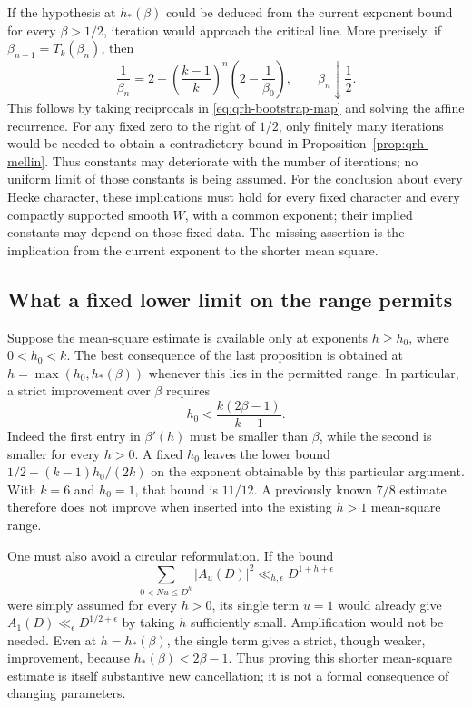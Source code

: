 If the hypothesis at $h_*(\beta)$ could be deduced from the
current exponent bound for every $\beta>1/2$, iteration
would approach the critical line. More precisely, if
$\beta_{n+1}=T_k(\beta_n)$, then
\[
 \frac1{\beta_n}
 =2-\left(\frac{k-1}{k}\right)^n
               \left(2-\frac1{\beta_0}\right),
 \qquad \beta_n\downarrow\frac12.
\]
This follows by taking reciprocals in
\eqref{eq:qrh-bootstrap-map} and solving the affine
recurrence. For any fixed zero to the right of $1/2$,
only finitely many iterations would be needed to obtain
a contradictory bound in Proposition~\ref{prop:qrh-mellin}.
Thus constants may deteriorate with the number of
iterations; no uniform limit of those constants is being
assumed. For the conclusion about every Hecke character, these
implications must hold for every fixed character and every
compactly supported smooth $W$, with a common exponent;
their implied constants may depend on those fixed data.
The missing assertion is the implication from the
current exponent to the shorter mean square.

\subsection{What a fixed lower limit on the range permits}

Suppose the mean-square estimate is available only at
exponents $h\ge h_0$, where $0<h_0<k$. The best consequence of the last
proposition is obtained at $h=\max(h_0,h_*(\beta))$
whenever this lies in the permitted range. In particular,
a strict improvement over $\beta$ requires
\[
 h_0<\frac{k(2\beta-1)}{k-1}.
\]
Indeed the first entry in $\beta'(h)$ must be smaller than
$\beta$, while the second is smaller for every $h>0$.
A fixed $h_0$ leaves the lower bound
$1/2+(k-1)h_0/(2k)$ on the exponent obtainable by this
particular argument. With $k=6$ and $h_0=1$, that bound
is $11/12$. A previously known $7/8$ estimate therefore
does not improve when inserted into the existing
$h>1$ mean-square range.

One must also avoid a circular reformulation. If the bound
\[
 \sum_{0<Nu\le D^h}|A_u(D)|^2\ll_{h,\epsilon}
                         D^{1+h+\epsilon}
\]
were simply assumed for every $h>0$, its single term
$u=1$ would already give
$A_1(D)\ll_\epsilon D^{1/2+\epsilon}$ by taking $h$
sufficiently small. Amplification would not be needed.
Even at $h=h_*(\beta)$, the single term gives a strict,
though weaker, improvement, because
$h_*(\beta)<2\beta-1$. Thus proving this shorter
mean-square estimate is itself substantive new cancellation;
it is not a formal consequence of changing parameters.

